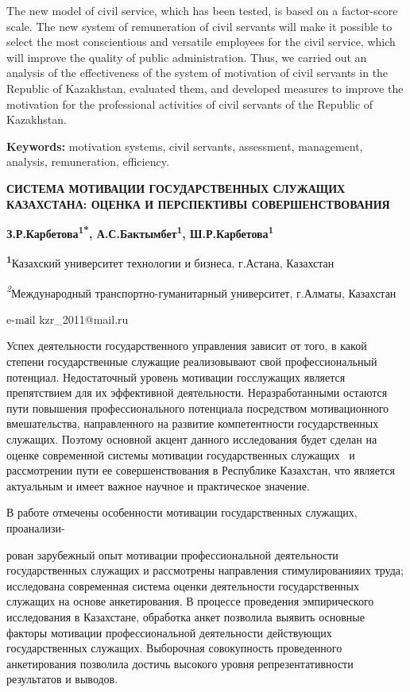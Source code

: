 The new model of civil service, which has been tested, is based on a
factor-score scale. The new system of remuneration of civil servants
will make it possible to select the most conscientious and versatile
employees for the civil service, which will improve the quality of
public administration. Thus, we carried out an analysis of the
effectiveness of the system of motivation of civil servants in the
Republic of Kazakhstan, evaluated them, and developed measures to
improve the motivation for the professional activities of civil servants
of the Republic of Kazakhstan.

\hspace{1.5em} {\bfseries Keywords:} motivation systems, civil servants, assessment,
management, analysis, remuneration, efficiency.

\begin{center}
{\large\bfseries СИСТЕМА МОТИВАЦИИ ГОСУДАРСТВЕННЫХ СЛУЖАЩИХ КАЗАХСТАНА: ОЦЕНКА И
ПЕРСПЕКТИВЫ СОВЕРШЕНСТВОВАНИЯ}

\vspace{1em}

{\bfseries З.Р.Карбетова\textsuperscript{1*},
А.С.Бактымбет\textsuperscript{1}, Ш.Р.Карбетова\textsuperscript{1}}

{\bfseries \textsuperscript{1}}Казахский университет технологии и бизнеса,
г.Астана, Казахстан

\emph{\textsuperscript{2}}Международный транспортно-гуманитарный
университет, г.Алматы, Казахстан

e-mаil kzr\_2011@mail.ru
\end{center}

\hspace{1.5em} Успех деятельности государственного управления зависит от того, в какой
степени государственные служащие реализовывают свой профессиональный
потенциал. Недостаточный уровень мотивации госслужащих является
препятствием для их эффективной деятельности. Неразработанными остаются
пути повышения профессионального потенциала посредством мотивационного
вмешательства, направленного на развитие компетентности государственных
служащих. Поэтому основной акцент данного исследования будет сделан на
оценке современной системы мотивации государственных служащих~ и
рассмотрении пути ее совершенствования в Республике Казахстан, что
является актуальным и имеет важное научное и практическое значение.

В работе отмечены особенности мотивации государственных служащих,
проанализи-

рован зарубежный опыт мотивации профессиональной деятельности
государственных служащих и рассмотрены направления стимулированияих
труда; исследована современная система оценки деятельности
государственных служащих на основе анкетирования. В процессе проведения
эмпирического исследования в Казахстане, обработка анкет позволила
выявить основные факторы мотивации профессиональной деятельности
действующих государственных служащих. Выборочная совокупность
проведенного анкетирования позволила достичь высокого уровня репрезентативности результатов и выводов.

